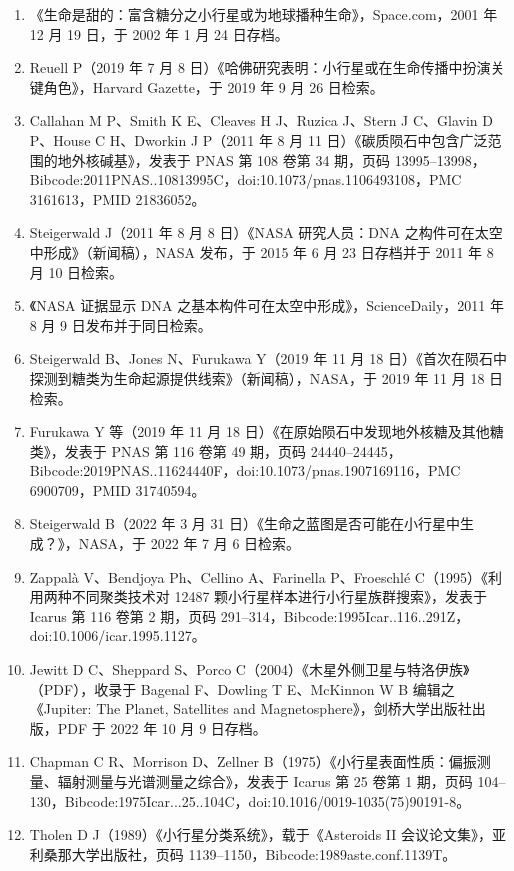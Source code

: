\begin{enumerate}
\item 《生命是甜的：富含糖分之小行星或为地球播种生命》，Space.com，2001 年 12 月 19 日，于 2002 年 1 月 24 日存档。
\item Reuell P（2019 年 7 月 8 日）《哈佛研究表明：小行星或在生命传播中扮演关键角色》，Harvard Gazette，于 2019 年 9 月 26 日检索。
\item Callahan M P、Smith K E、Cleaves H J、Ruzica J、Stern J C、Glavin D P、House C H、Dworkin J P（2011 年 8 月 11 日）《碳质陨石中包含广泛范围的地外核碱基》，发表于 PNAS 第 108 卷第 34 期，页码 13995–13998，Bibcode:2011PNAS..10813995C，doi:10.1073/pnas.1106493108，PMC 3161613，PMID 21836052。
\item Steigerwald J（2011 年 8 月 8 日）《NASA 研究人员：DNA 之构件可在太空中形成》（新闻稿），NASA 发布，于 2015 年 6 月 23 日存档并于 2011 年 8 月 10 日检索。
\item 《NASA 证据显示 DNA 之基本构件可在太空中形成》，ScienceDaily，2011 年 8 月 9 日发布并于同日检索。
\item Steigerwald B、Jones N、Furukawa Y（2019 年 11 月 18 日）《首次在陨石中探测到糖类为生命起源提供线索》（新闻稿），NASA，于 2019 年 11 月 18 日检索。
\item Furukawa Y 等（2019 年 11 月 18 日）《在原始陨石中发现地外核糖及其他糖类》，发表于 PNAS 第 116 卷第 49 期，页码 24440–24445，Bibcode:2019PNAS..11624440F，doi:10.1073/pnas.1907169116，PMC 6900709，PMID 31740594。
\item Steigerwald B（2022 年 3 月 31 日）《生命之蓝图是否可能在小行星中生成？》，NASA，于 2022 年 7 月 6 日检索。
\item Zappalà V、Bendjoya Ph、Cellino A、Farinella P、Froeschlé C（1995）《利用两种不同聚类技术对 12487 颗小行星样本进行小行星族群搜索》，发表于 Icarus 第 116 卷第 2 期，页码 291–314，Bibcode:1995Icar..116..291Z，doi:10.1006/icar.1995.1127。
\item Jewitt D C、Sheppard S、Porco C（2004）《木星外侧卫星与特洛伊族》（PDF），收录于 Bagenal F、Dowling T E、McKinnon W B 编辑之《Jupiter: The Planet, Satellites and Magnetosphere》，剑桥大学出版社出版，PDF 于 2022 年 10 月 9 日存档。
\item Chapman C R、Morrison D、Zellner B（1975）《小行星表面性质：偏振测量、辐射测量与光谱测量之综合》，发表于 Icarus 第 25 卷第 1 期，页码 104–130，Bibcode:1975Icar...25..104C，doi:10.1016/0019-1035(75)90191-8。
\item Tholen D J（1989）《小行星分类系统》，载于《Asteroids II 会议论文集》，亚利桑那大学出版社，页码 1139–1150，Bibcode:1989aste.conf.1139T。

\end{enumerate}
